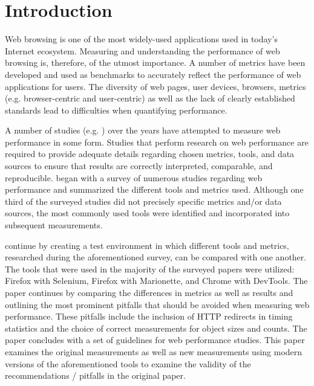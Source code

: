 \section{Introduction}
Web browsing is one of the most widely-used applications used in today's Internet ecosystem. Measuring and understanding the performance of web browsing is, therefore, of the utmost importance. A number of metrics have been developed and used as benchmarks to accurately reflect the performance of web applications for users. The diversity of web pages, user devices, browsers, metrics (e.g. browser-centric and user-centric) as well as the lack of clearly established standards lead to difficulties when quantifying performance. 

A number of studies (e.g. \citet{10.1007/978-3-319-30505-9_17}) over the years have attempted to measure web performance in some form. Studies that perform research on web performance are required to provide adequate details regarding chosen metrics, tools, and data sources to ensure that results are correctly interpreted, comparable, and reproducible. \citeauthor{10.1007/978-3-030-15986-3_19} began with a survey of numerous studies regarding web performance and summarized the different tools and metrics used. Although one third of the surveyed studies did not precisely specific metrics and/or data sources, the most commonly used tools were identified and incorporated into subsequent measurements. 

\citeauthor{10.1007/978-3-030-15986-3_19} continue by creating a test environment in which different tools and metrics, researched during the aforementioned survey, can be compared with one another. The tools that were used in the majority of the surveyed papers were utilized: Firefox with Selenium, Firefox with Marionette, and Chrome with DevTools. The paper continues by comparing the differences in metrics as well as results and outlining the most prominent pitfalls that should be avoided when measuring web performance. These pitfalls include the inclusion of HTTP redirects in timing statistics and the choice of correct measurements for object sizes and counts. The paper concludes with a set of guidelines for web performance studies. This paper examines the original measurements as well as new measurements using modern versions of the aforementioned tools to examine the validity of the recommendations / pitfalls in the original paper.